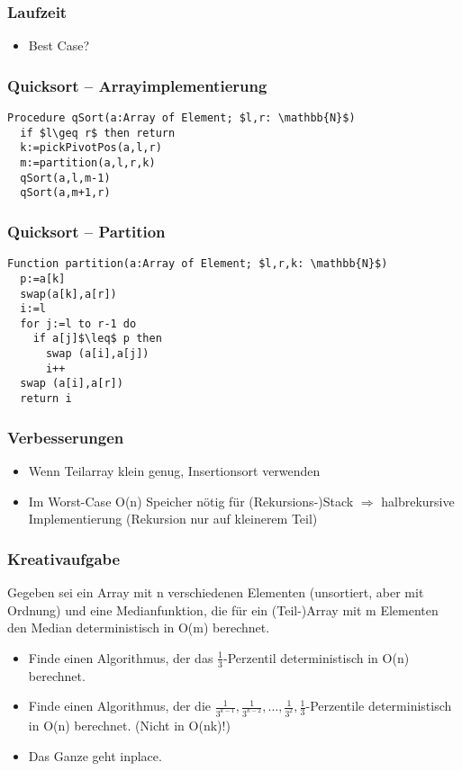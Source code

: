 \begin{frame}
\frametitle{Laufzeit}
\begin{itemize}
\item Best Case? 
\end{itemize}
\end{frame}

\begin{frame}[fragile]
\frametitle{Quicksort -- Arrayimplementierung}
\begin{lstlisting}
Procedure qSort(a:Array of Element; $l,r: \mathbb{N}$)
  if $l\geq r$ then return
  k:=pickPivotPos(a,l,r)
  m:=partition(a,l,r,k)
  qSort(a,l,m-1)
  qSort(a,m+1,r)
\end{lstlisting}
\end{frame}

\begin{frame}[fragile]
\frametitle{Quicksort -- Partition}
\begin{lstlisting}
Function partition(a:Array of Element; $l,r,k: \mathbb{N}$)
  p:=a[k]
  swap(a[k],a[r])
  i:=l
  for j:=l to r-1 do
    if a[j]$\leq$ p then
      swap (a[i],a[j])
      i++
  swap (a[i],a[r])
  return i
\end{lstlisting}
\end{frame}

\begin{frame}
\frametitle{Verbesserungen}
\begin{itemize}
\item Wenn Teilarray klein genug, Insertionsort verwenden\pause
\item Im Worst-Case O(n) Speicher nötig für (Rekursions-)Stack $\Rightarrow$ halbrekursive Implementierung (Rekursion nur auf kleinerem Teil)
\end{itemize}
\end{frame}

\begin{frame}
\frametitle{Kreativaufgabe}
Gegeben sei ein Array mit n verschiedenen Elementen (unsortiert, aber mit Ordnung) und eine
Medianfunktion, die für ein (Teil-)Array mit m Elementen den Median deterministisch in O(m)
berechnet.
\begin{itemize}
\item Finde einen Algorithmus, der das $\frac{1}{3}$-Perzentil deterministisch in O(n) berechnet.
\item Finde einen Algorithmus, der die $\frac{1}{3^{k-1}},\frac{1}{3^{k-2}},\ldots,\frac{1}{3^2},\frac{1}{3}$-Perzentile deterministisch in O(n) berechnet. (Nicht in O(nk)!)
\item Das Ganze geht inplace.
\end{itemize}
\end{frame}
